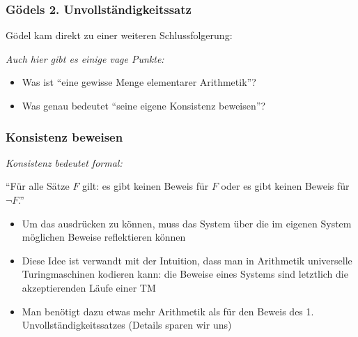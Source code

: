 \documentclass[aspectratio=1610,onlymath]{beamer}
\begin{document}
\begin{frame}\frametitle{Gödels 2. Unvollständigkeitssatz}

Gödel kam direkt zu einer weiteren Schlussfolgerung:\medskip

\bigskip

\emph{Auch hier gibt es einige vage Punkte:}
\begin{itemize}
\item Was ist \alert{"`eine gewisse Menge elementarer Arithmetik"'}?
\item Was genau bedeutet \alert{"`seine eigene Konsistenz beweisen"'}?
\end{itemize}

\end{frame}

\begin{frame}\frametitle{Konsistenz beweisen}

\emph{Konsistenz bedeutet formal:}\medskip

"`Für alle Sätze $F$ gilt: es gibt keinen Beweis für $F$ oder es gibt keinen Beweis für $\neg F$."'
\bigskip

\begin{itemize}
\item Um das ausdrücken zu können, muss das System über die im eigenen System möglichen Beweise reflektieren können
\item Diese Idee ist verwandt mit der Intuition, dass man in Arithmetik universelle Turingmaschinen kodieren kann: die Beweise eines Systems sind letztlich die akzeptierenden Läufe einer TM
\item Man benötigt dazu etwas mehr Arithmetik als für den Beweis des 1. Unvollständigkeitssatzes (Details sparen wir uns)
\end{itemize}

\end{frame}
\end{document}
